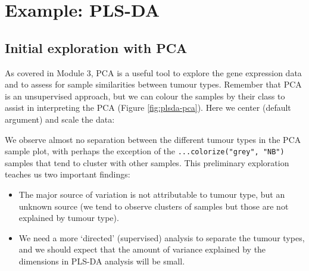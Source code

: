 \documentclass[
]{book}
\newenvironment{Shaded}{\begin{snugshade}}{\end{snugshade}}
\newcommand{\AttributeTok}[1]{\textcolor[rgb]{0.77,0.63,0.00}{#1}}
\newcommand{\ConstantTok}[1]{\textcolor[rgb]{0.00,0.00,0.00}{#1}}
\newcommand{\DecValTok}[1]{\textcolor[rgb]{0.00,0.00,0.81}{#1}}
\newcommand{\FunctionTok}[1]{\textcolor[rgb]{0.00,0.00,0.00}{#1}}
\newcommand{\NormalTok}[1]{#1}
\newcommand{\OtherTok}[1]{\textcolor[rgb]{0.56,0.35,0.01}{#1}}
\newcommand{\SpecialCharTok}[1]{\textcolor[rgb]{0.00,0.00,0.00}{#1}}
\newcommand{\StringTok}[1]{\textcolor[rgb]{0.31,0.60,0.02}{#1}}
\providecommand{\tightlist}{%
  \setlength{\itemsep}{0pt}\setlength{\parskip}{0pt}}
\begin{document}
\hypertarget{ex:plsda}{%
\section{Example: PLS-DA}\label{ex:plsda}}

\hypertarget{initial-exploration-with-pca}{%
\subsection{Initial exploration with PCA}\label{initial-exploration-with-pca}}

As covered in Module 3, PCA is a useful tool to explore the gene expression data and to assess for sample similarities between tumour types. Remember that PCA is an unsupervised approach, but we can colour the samples by their class to assist in interpreting the PCA (Figure \ref{fig:plsda-pca}). Here we center (default argument) and scale the data:

\begin{Shaded}
\end{Shaded}



We observe almost no separation between the different tumour types in the PCA sample plot, with perhaps the exception of the \texttt{...colorize("grey",\ "NB")} samples that tend to cluster with other samples. This preliminary exploration teaches us two important findings:

\begin{itemize}
\tightlist
\item
  The major source of variation is not attributable to tumour type, but an unknown source (we tend to observe clusters of samples but those are not explained by tumour type).
\item
  We need a more `directed' (supervised) analysis to separate the tumour types, and we should expect that the amount of variance explained by the dimensions in PLS-DA analysis will be small.
\end{itemize}
\end{document}
